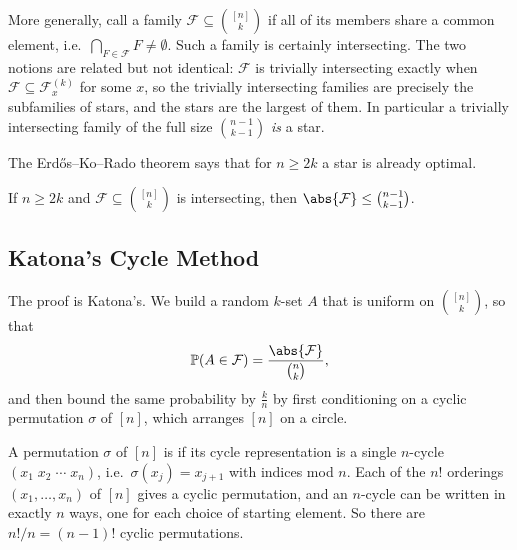 More generally, call a family \(\mathcal{F} \subseteq \binom{[n]}{k}\)  if all of its members share a common element, i.e.\ \(\bigcap_{F \in \mathcal{F}} F \ne \emptyset\). Such a family is certainly intersecting. The two notions are related but not identical: \(\mathcal{F}\) is trivially intersecting exactly when \(\mathcal{F} \subseteq \mathcal{F}_x^{(k)}\) for some \(x\), so the trivially intersecting families are precisely the subfamilies of stars, and the stars are the largest of them. In particular a trivially intersecting family of the full size \(\binom{n-1}{k-1}\) \emph{is} a star.

The Erd\H{o}s--Ko--Rado theorem says that for \(n \ge 2k\) a star is already optimal.

\begin{theorem}\label{thm:ekr}
    If \(n \ge 2k\) and \(\mathcal{F} \subseteq \binom{[n]}{k}\) is intersecting, then \(\abs{\mathcal{F}} \le \binom{n-1}{k-1}\).
\end{theorem}

\subsection{Katona's Cycle Method}

The proof is Katona's. We build a random \(k\)-set \(A\) that is uniform on \(\binom{[n]}{k}\), so that
\[
    \mathbb{P}(A \in \mathcal{F}) = \frac{\abs{\mathcal{F}}}{\binom{n}{k}},
\]
and then bound the same probability by \(\frac{k}{n}\) by first conditioning on a cyclic permutation \(\sigma\) of \([n]\), which arranges \([n]\) on a circle.

\begin{definition}
    A permutation \(\sigma\) of \([n]\) is  if its cycle representation is a single \(n\)-cycle \((x_1 \; x_2 \; \cdots \; x_n)\), i.e.\ \(\sigma(x_j) = x_{j+1}\) with indices mod \(n\). Each of the \(n!\) orderings \((x_1, \ldots, x_n)\) of \([n]\) gives a cyclic permutation, and an \(n\)-cycle can be written in exactly \(n\) ways, one for each choice of starting element. So there are \(n!/n = (n-1)!\) cyclic permutations.
\end{definition}

